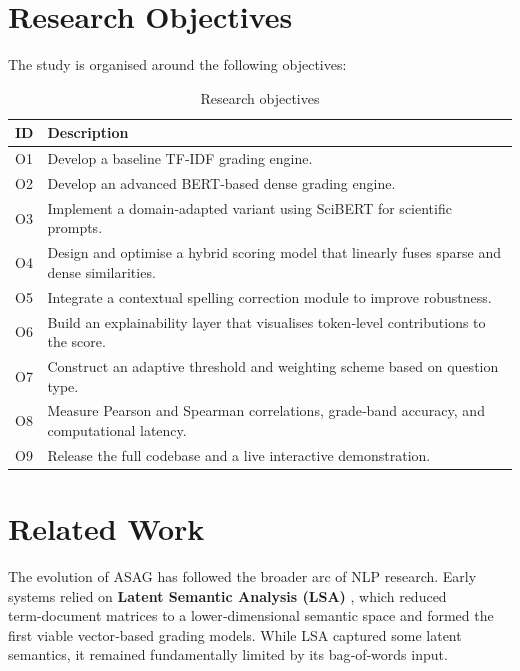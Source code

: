 \documentclass[11pt,a4paper]{article}
\begin{document}
\section{Research Objectives}
\label{sec:objectives}
The study is organised around the following objectives:

\begin{table}[H]
\centering
\caption{Research objectives}
\label{tab:objectives}
\begin{tabular}{p{} p{}}
\toprule
\textbf{ID} & \textbf{Description} \\
\midrule
O1 & Develop a baseline TF‑IDF grading engine. \\
O2 & Develop an advanced BERT‑based dense grading engine. \\
O3 & Implement a domain‑adapted variant using SciBERT for scientific prompts. \\
O4 & Design and optimise a hybrid scoring model that linearly fuses sparse and dense similarities. \\
O5 & Integrate a contextual spelling correction module to improve robustness. \\
O6 & Build an explainability layer that visualises token‑level contributions to the score. \\
O7 & Construct an adaptive threshold and weighting scheme based on question type. \\
O8 & Measure Pearson and Spearman correlations, grade‑band accuracy, and computational latency. \\
O9 & Release the full codebase and a live interactive demonstration. \\
\bottomrule
\end{tabular}
\end{table}

\section{Related Work}
\label{sec:related}
The evolution of ASAG has followed the broader arc of NLP research. Early systems relied on \textbf{Latent Semantic Analysis (LSA)} \cite{landauer1997solution, rehder1998using}, which reduced term‑document matrices to a lower‑dimensional semantic space and formed the first viable vector‑based grading models. While LSA captured some latent semantics, it remained fundamentally limited by its bag‑of‑words input.
\end{document}
